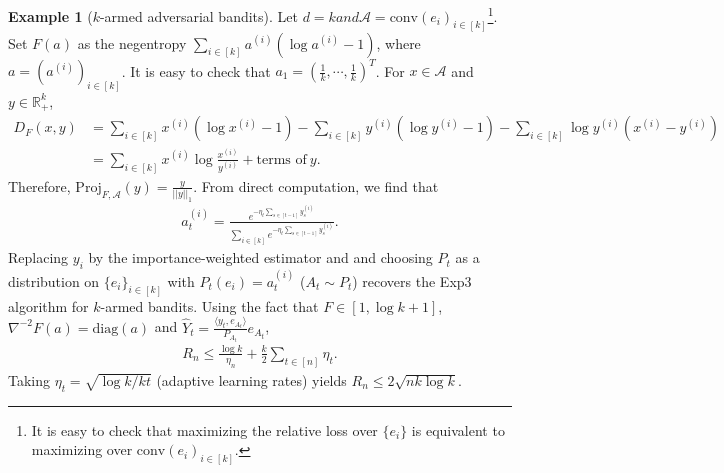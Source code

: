 \documentclass[10pt,a4article]{amsart}
\numberwithin{equation}{section}
\theoremstyle{plain}
\theoremstyle{definition}
\newtheorem{Ex}[Th]{Example}
\def\R{{\mathbb R}}
\def\R{{\mathbb R}}
\begin{document}
\begin{Ex}[$k$-armed adversarial bandits]\label{al:ex1}
Let $d=k and \mathcal A = \text{conv}(e_i)_{i\in [k]}$\footnote{It is easy to check that maximizing the relative loss over $\{e_i\}$ is equivalent to maximizing over $\text{conv}(e_i)_{i\in [k]}$.}. Set $F(a)$ as the negentropy $\sum_{i\in [k]}a^{(i)}(\log a^{(i)}-1)$, where $a=(a^{(i)})_{i\in [k]}$. It is easy to check that $a_1=(\frac{1}{k}, \cdots, \frac{1}{k})^T$. For $x\in\mathcal A$ and $y\in\R_+^k$, 
\begin{align*}
D_F(x,y) &= \sum_{i\in [k]}x^{(i)}(\log x^{(i)}-1)-\sum_{i\in [k]}y^{(i)}(\log y^{(i)}-1)-\sum_{i\in [k]}\log y^{(i)}(x^{(i)}-y^{(i)})\\
& = \sum_{i\in [k]}x^{(i)}\log \frac{x^{(i)}}{y^{(i)}}+\text{terms of}\ y.
\end{align*}
Therefore, $\text{Proj}_{F, \mathcal A}(y) = \frac{y}{||y||_1}$. From direct computation, we find that
\begin{align}
a_t^{(i)} = \frac{e^{-\eta_t\sum_{s\in [t-1]} y_s^{(i)}}}{\sum_{i\in [k]}e^{-\eta_t\sum_{s\in [t-1]} y_s^{(i)}}}. \label{al:5}
\end{align}
Replacing $y_i$ by the importance-weighted estimator and and choosing $P_t$ as a distribution on $\{e_i\}_{i\in [k]}$ with $P_t(e_i)=a_t^{(i)}$ ($A_t\sim P_t$) recovers the Exp3 algorithm for $k$-armed bandits. 
Using the fact that $F\in [1,\log k+1] $, $\nabla^{-2} F(a) = \text{diag}(a)$ and $\hat{Y}_t=\frac{\langle y_t, e_{A_t}\rangle}{P_{A_t}}e_{A_t}$,
\begin{align*}
R_n\leq\frac{\log k}{\eta_n}+\frac{k}{2}\sum_{t\in [n]}\eta_t.
\end{align*}
Taking $\eta_t = \sqrt{\log k/kt}$ (adaptive learning rates) yields $R_n\leq 2\sqrt{nk\log k}$.
\end{Ex}
\end{document}
